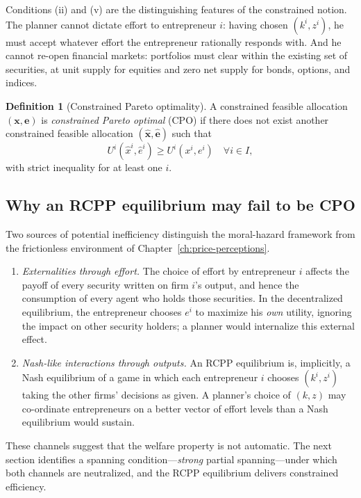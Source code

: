 \documentclass[11pt,a4paper,oneside]{book}
\def\geq{\geqslant}
\theoremstyle{plain}
\theoremstyle{definition}
\newtheorem{definition}[theorem]{Definition}
\theoremstyle{remark}
\numberwithin{equation}{chapter}
\begin{document}
Conditions (ii) and (v) are the distinguishing features of the constrained notion.
The planner cannot dictate effort to entrepreneur $i$: having chosen $(k^i, z^i)$, he must accept whatever effort the entrepreneur rationally responds with.
And he cannot re-open financial markets: portfolios must clear within the existing set of securities, at unit supply for equities and zero net supply for bonds, options, and indices.

\begin{definition}[Constrained Pareto optimality]\label{def:MH-CPO}
A constrained feasible allocation $(\bm{x}, \bm{e})$ is \emph{constrained Pareto optimal} (CPO) if there does not exist another constrained feasible allocation $(\widehat{\bm{x}}, \widehat{\bm{e}})$ such that
\begin{equation*}
  U^i(\widehat{x}^i, \widehat{e}^i) \geq U^i(x^i, e^i) \quad \forall i \in I,
\end{equation*}
with strict inequality for at least one $i$.
\end{definition}

\subsection{Why an RCPP equilibrium may fail to be CPO}

Two sources of potential inefficiency distinguish the moral-hazard framework from the frictionless environment of Chapter~\ref{ch:price-perceptions}.
\begin{enumerate}
  \item \emph{Externalities through effort.}
  The choice of effort by entrepreneur $i$ affects the payoff of every security written on firm $i$'s output, and hence the consumption of every agent who holds those securities.
  In the decentralized equilibrium, the entrepreneur chooses $e^i$ to maximize his \emph{own} utility, ignoring the impact on other security holders; a planner would internalize this external effect.
  \item \emph{Nash-like interactions through outputs.}
  An RCPP equilibrium is, implicitly, a Nash equilibrium of a game in which each entrepreneur $i$ chooses $(k^i, z^i)$ taking the other firms' decisions as given.
  A planner's choice of $(k, z)$ may co-ordinate entrepreneurs on a better vector of effort levels than a Nash equilibrium would sustain.
\end{enumerate}
These channels suggest that the welfare property is not automatic.
The next section identifies a spanning condition---\emph{strong} partial spanning---under which both channels are neutralized, and the RCPP equilibrium delivers constrained efficiency.
\end{document}
